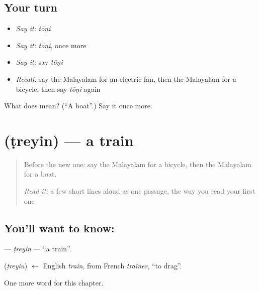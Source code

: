 \subsection*{Your turn}
\begin{itemize}
\raggedright
  \item \emph{Say it:} \emph{tōṇi}
  \item \emph{Say it:} \emph{tōṇi}, once more
  \item \emph{Say it:} say \emph{tōṇi}
  \item \emph{Recall:} say the Malayalam for an electric fan, then the Malayalam for a bicycle, then say \emph{tōṇi} again
\end{itemize}

\begin{tcolorbox}[breakable,colback=teal!4,colframe=teal!35!black,title={Before you move on}]
What does  mean? (\textquotedblleft{}A boat\textquotedblright{}.) Say it once more.
\end{tcolorbox}
\section[\texorpdfstring{\ml{ട്രെയിൻ} (ṭreyin)}{ട്രെയിൻ (ṭreyin)}]{ (ṭreyin) — a train}

\label{lesson:ML-C158-treyin}



\begin{quote}
Before the new one: say the Malayalam for a bicycle, then the Malayalam for a boat.

\emph{Read it:} a few short lines aloud as one passage, the way you read your first one
\end{quote}

\subsection*{You'll want to know: }
\textbf{} — \emph{ṭreyin} — \textquotedblleft{}a train\textquotedblright{}.

\begin{cousinweb}
\textbf{} (\emph{ṭreyin}) $\leftarrow$ English \emph{train}, from French \emph{traîner}, \textquotedblleft{}to drag\textquotedblright{}.
\end{cousinweb}

\begin{grammarlens}[title={What you've built}]
One more word for this chapter.
\end{grammarlens}

